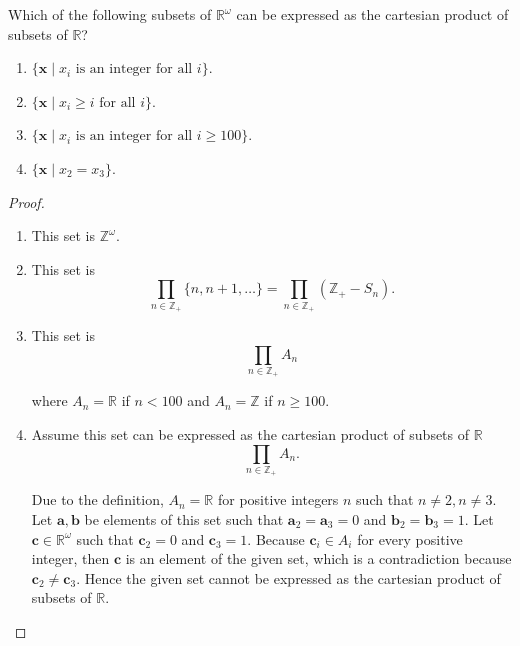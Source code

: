 \begin{exercise}\label{chapter1:section5:exercise5}
    Which of the following subsets of $\mathbb{R}^{\omega}$ can be expressed as the cartesian product of subsets of $\mathbb{R}$?
    \begin{enumerate}[label={(\alph*)}]
        \item $\{ \mathbf{x} \mid \text{$x_{i}$ is an integer for all $i$} \}$.
        \item $\{ \mathbf{x} \mid \text{$x_{i}\geq i$ for all $i$} \}$.
        \item $\{ \mathbf{x} \mid \text{$x_{i}$ is an integer for all $i\geq 100$} \}$.
        \item $\{ \mathbf{x} \mid x_{2} = x_{3} \}$.
    \end{enumerate}
\end{exercise}

\begin{proof}
    \begin{enumerate}[label={(\alph*)}]
        \item This set is $\mathbb{Z}^{\omega}$.
        \item This set is
              \[
                  \prod_{n\in\mathbb{Z}_{+}}\{ n, n+1, \ldots \} = \prod_{n\in\mathbb{Z}_{+}}(\mathbb{Z}_{+} - S_{n}).
              \]
        \item This set is
              \[
                  \prod_{n\in\mathbb{Z}_{+}}A_{n}
              \]

              where $A_{n} = \mathbb{R}$ if $n < 100$ and $A_{n} = \mathbb{Z}$ if $n\geq 100$.
        \item Assume this set can be expressed as the cartesian product of subsets of $\mathbb{R}$
              \[
                  \prod_{n\in\mathbb{Z}_{+}}A_{n}.
              \]

              Due to the definition, $A_{n} = \mathbb{R}$ for positive integers $n$ such that $n\ne 2, n\ne 3$. Let $\mathbf{a}, \mathbf{b}$ be elements of this set such that $\mathbf{a}_{2} = \mathbf{a}_{3} = 0$ and $\mathbf{b}_{2} = \mathbf{b}_{3} = 1$. Let $\mathbf{c}\in \mathbb{R}^{\omega}$ such that $\mathbf{c}_{2} = 0$ and $\mathbf{c}_{3} = 1$. Because $\mathbf{c}_{i}\in A_{i}$ for every positive integer, then $\mathbf{c}$ is an element of the given set, which is a contradiction because $\mathbf{c}_{2}\ne \mathbf{c}_{3}$. Hence the given set cannot be expressed as the cartesian product of subsets of $\mathbb{R}$.
    \end{enumerate}
\end{proof}

